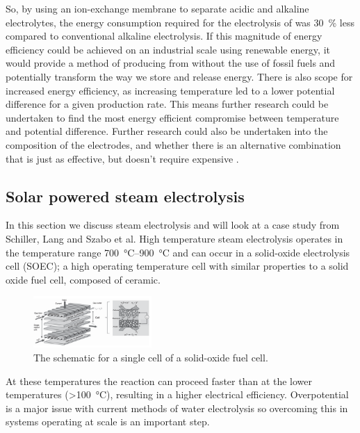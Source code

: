 So, by using an ion-exchange membrane to separate acidic and alkaline electrolytes, the energy consumption required for the electrolysis of  was \SI{30}{\percent} less compared to conventional alkaline electrolysis.
If this magnitude of energy efficiency could be achieved on an industrial scale using renewable energy, it would provide a method of producing  from  without the use of fossil fuels and potentially transform the way we store and release energy.
There is also scope for increased energy efficiency, as increasing temperature led to a lower potential difference for a given  production rate.
This means further research could be undertaken to find the most energy efficient compromise between temperature and potential difference.
Further research could also be undertaken into the composition of the electrodes, and whether there is an alternative combination that is just as effective, but doesn’t require expensive .


\subsection{Solar powered steam electrolysis}%
\label{sub:solar_powered_steam_electrolysis}
\cite{Schiller2019}

In this section we discuss steam electrolysis and will look at a case study from Schiller, Lang and Szabo et al\cite{Schiller2019}.
High temperature steam electrolysis operates in the temperature range \SIrange{700}{900}{\celsius}\cite{Schiller2019} and can occur in a solid-oxide electrolysis cell (SOEC); a high operating temperature cell with similar properties to a solid oxide fuel cell, composed of ceramic\cite{Laurencin}.
\begin{figure}[H]
	\centering
	\includegraphics[width=0.4\textwidth]{cf89a71a-2c53-11eb-895f-8c8590753a48.png}
	\caption{The schematic for a single cell of a solid-oxide fuel cell.}
	\label{fig:SE_cell}
\end{figure}
At these temperatures the reaction can proceed faster than at the lower temperatures (\SI{>100}{\celsius}), resulting in a higher electrical efficiency\cite{Schiller2019}.
Overpotential is a major issue with current methods of water electrolysis so overcoming this in systems operating at scale is an important step.

